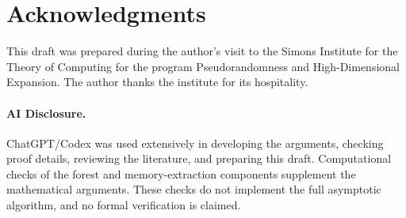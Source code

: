 \documentclass[letterpaper,11pt]{article}
\theoremstyle{definition}
\begin{document}


\section*{Acknowledgments}
This draft was prepared during the author's visit to the Simons Institute
for the Theory of Computing for the program Pseudorandomness and
High-Dimensional Expansion. The author thanks the institute for its
hospitality.

\paragraph{AI Disclosure.}
ChatGPT/Codex was used extensively in developing the arguments, checking
proof details, reviewing the literature, and preparing this draft.
Computational checks of the forest and memory-extraction components
supplement the mathematical arguments. These checks do not implement
the full asymptotic algorithm, and no formal verification is claimed.
\end{document}
